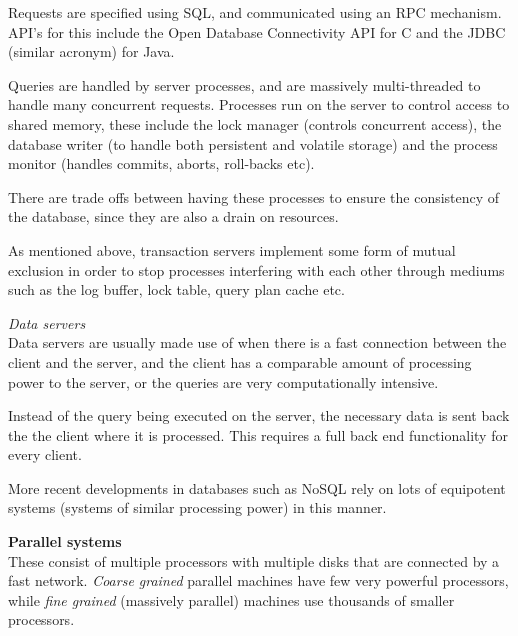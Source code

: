 \begin{description}
\begin{description}
        Requests are specified using SQL, and communicated using an RPC
        mechanism.  API's for this include the Open Database Connectivity API for C
        and the JDBC (similar acronym) for Java.

        Queries are handled by server processes, and are massively
        multi-threaded to handle many concurrent requests. Processes run on the
        server to control access to shared memory, these include the lock
        manager (controls concurrent access), the database writer (to handle
        both persistent and volatile storage) and the process monitor (handles
        commits, aborts, roll-backs etc).

        There are trade offs between having these processes to ensure the
        consistency of the database, since they are also a drain on resources.

        As mentioned above, transaction servers implement some form of mutual
        exclusion in order to stop processes interfering with each other through
        mediums such as the log buffer, lock table, query plan cache etc.

      \item \textit{Data servers}\\
        Data servers are usually made use of when there is a fast connection
        between the client and the server, and the client has a comparable
        amount of processing power to the server, or the queries are very
        computationally intensive.

        Instead of the query being executed on the server, the necessary data is
        sent back the the client where it is processed. This requires a full
        back end functionality for every client.

        More recent developments in databases such as NoSQL rely on lots of
        equipotent systems (systems of similar processing power) in this manner.

    \end{description}

  \item \textbf{Parallel systems}\\
    These consist of multiple processors with multiple disks that are connected
    by a fast network. \textit{Coarse grained} parallel machines have few very
    powerful processors, while \textit{fine grained} (massively parallel)
    machines use thousands of smaller processors.


\end{description}
